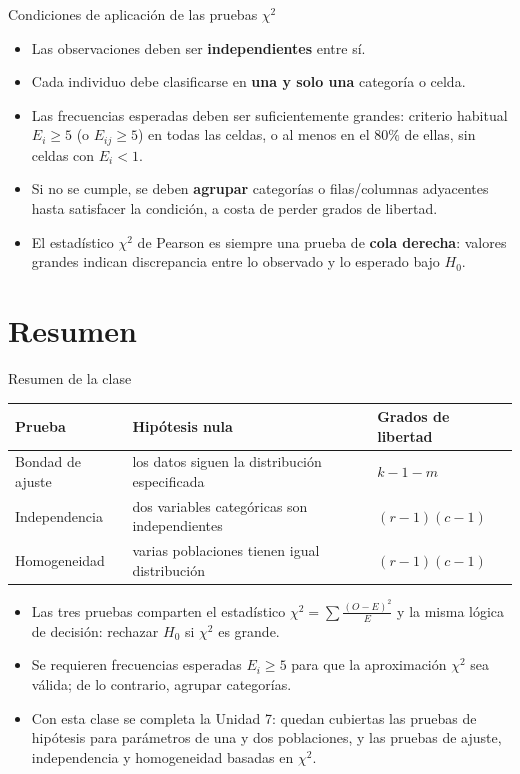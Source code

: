 \documentclass[aspectratio=169,11pt]{beamer}
\begin{document}
\begin{frame}{Condiciones de aplicación de las pruebas $\chi^2$}
\begin{itemize}
\item Las observaciones deben ser \textbf{independientes} entre sí.
\item Cada individuo debe clasificarse en \textbf{una y solo una} categoría o celda.
\item Las frecuencias esperadas deben ser suficientemente grandes: criterio habitual $E_i\ge5$ (o $E_{ij}\ge5$) en todas las celdas, o al menos en el $80\%$ de ellas, sin celdas con $E_i<1$.
\item Si no se cumple, se deben \textbf{agrupar} categorías o filas/columnas adyacentes hasta satisfacer la condición, a costa de perder grados de libertad.
\item El estadístico $\chi^2$ de Pearson es siempre una prueba de \textbf{cola derecha}: valores grandes indican discrepancia entre lo observado y lo esperado bajo $H_0$.
\end{itemize}
\end{frame}

\section{Resumen}

\begin{frame}{Resumen de la clase}
\begin{table}[]
\centering
\scriptsize
\begin{tabular}{@{}p{2.6cm}p{4.6cm}p{2.3cm}@{}}
\toprule
Prueba & Hipótesis nula & Grados de libertad \\
\midrule
Bondad de ajuste & los datos siguen la distribución especificada & $k-1-m$ \\
Independencia & dos variables categóricas son independientes & $(r-1)(c-1)$ \\
Homogeneidad & varias poblaciones tienen igual distribución & $(r-1)(c-1)$ \\
\bottomrule
\end{tabular}
\end{table}

\begin{itemize}
\item Las tres pruebas comparten el estadístico $\displaystyle\chi^2=\sum\frac{(O-E)^2}{E}$ y la misma lógica de decisión: rechazar $H_0$ si $\chi^2$ es grande.
\item Se requieren frecuencias esperadas $E_i\ge5$ para que la aproximación $\chi^2$ sea válida; de lo contrario, agrupar categorías.
\item Con esta clase se completa la Unidad 7: quedan cubiertas las pruebas de hipótesis para parámetros de una y dos poblaciones, y las pruebas de ajuste, independencia y homogeneidad basadas en $\chi^2$.
\end{itemize}
\end{frame}
\end{document}
